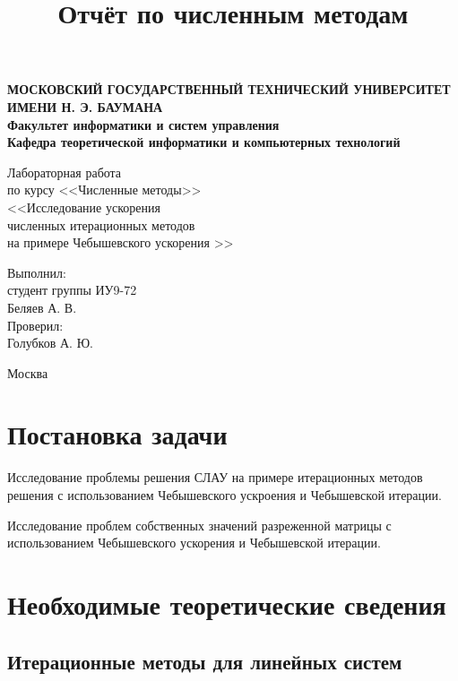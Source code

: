 \documentclass[12pt]{article}
\title{Отчёт по численным методам}
\date{}
\author{}
\begin{document}
    \newpage
    {
        \thispagestyle{empty}
        \centering
        
        \textbf{
        МОСКОВСКИЙ ГОСУДАРСТВЕННЫЙ ТЕХНИЧЕСКИЙ УНИВЕРСИТЕТ ИМЕНИ Н. Э. БАУМАНА \\
        Факультет информатики и систем управления \\
        Кафедра теоретической информатики и компьютерных технологий}
        \bigskip
        \bigskip
        \bigskip
        \bigskip
        \bigskip
        \bigskip
        \bigskip

        \vfill

        {\large Лабораторная работа}\\
        по курсу <<Численные методы>>\\
	\LARGE{<<Исследование ускорения \\
	численных итерационных методов \\
	на примере Чебышевского ускорения >> }
	\normalsize

        \bigskip
        \vfill
        \hfill\parbox{5cm} {
            Выполнил:\\
            студент группы ИУ9-72 \hfill \\
            Беляев А. В.\hfill \medskip\\
            Проверил:\\
            Голубков А. Ю.\hfill
        }
        \vspace{\fill}

        
        Москва \number\year
        \clearpage
    }
	\newpage
	{
		\tableofcontents
		\clearpage
	}
    {
        \section{Постановка задачи}
    }
    
    	Исследование проблемы решения СЛАУ на примере итерационных методов решения с использованием Чебышевского ускроения и Чебышевской итерации. 
    
    	Исследование проблем собственных значений разреженной матрицы с использованием Чебышевского ускорения и Чебышевской итерации.
 
	
    \bigskip
    
    {
        \section{Необходимые теоретические сведения}
    }
    
    {
    	\subsection{Итерационные методы для линейных систем}
    }
    
\end{document}
